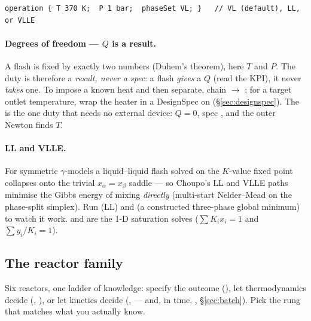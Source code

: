 \documentclass[11pt,a4paper]{article}
\begin{document}
\begin{lstlisting}[language=dict]
operation { T 370 K;  P 1 bar;  phaseSet VL; }   // VL (default), LL, or VLLE
\end{lstlisting}

\paragraph{Degrees of freedom --- $Q$ is a result.}  A flash is fixed by
exactly two numbers (Duhem's theorem), here $T$ and $P$.  The duty is
therefore a \emph{result, never a spec}: a flash \emph{gives} a $Q$
(read the  KPI), it never \emph{takes} one.  To impose a
known heat and then separate, chain  $\to$
; for a target outlet temperature, wrap the heater in a
DesignSpec on  (\S\ref{sec:designspec}).  The
 is the one duty that needs no external device:
$Q = 0$, spec , and the outer Newton finds $T$.

\paragraph{LL and VLLE.}  For symmetric $\gamma$-models a
liquid--liquid flash solved on the $K$-value fixed point collapses onto
the trivial $x_\alpha = x_\beta$ saddle --- so Choupo's LL and VLLE
paths minimise the Gibbs energy of mixing \emph{directly}
(multi-start Nelder--Mead on the phase-split simplex).  Run
 (LL) and
 (a
constructed three-phase global minimum) to watch it work.
 and  are the 1-D saturation solves
($\sum K_i x_i = 1$ and $\sum y_i/K_i = 1$).

\subsection{The reactor family}\label{sec:reactors}

\begin{whatyoulllearn}
Six reactors, one ladder of knowledge: specify the outcome
(), let thermodynamics
decide (, ), or let kinetics
decide (,  --- and, in time,
, \S\ref{sec:batch}).  Pick the rung that matches
what you actually know.
\end{whatyoulllearn}
\end{document}
